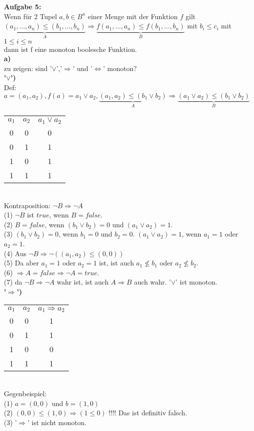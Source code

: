 \documentclass[a4paper]{scrartcl}
\begin{document}
 	\begin{flushleft}
		\textbf{Aufgabe 5:}\\
		Wenn für 2 Tupel $a,b \in B^n$ einer Menge mit der Funktion $f$ gilt $\underbrace{(a_1,\dots,a_n) \leq (b_1,\dots,b_n)}_{A}\Rightarrow \underbrace{f(a_1,\dots,a_n)\leq f(b_1,\dots,b_n)}_{B}$ mit $b_i\leq c_i$ mit $1\leq i\leq n$\\
		dann ist f eine monoton boolesche Funktion.\\[1em]
		\textbf{a)}\\
		zu zeigen: sind '$\vee$','$\Rightarrow$' und '$\Leftrightarrow$' monoton?\\[1em]
		\textbf{'$\vee$')}\\
		Def: $a=(a_1,a_2), f(a) = a_1\vee a_2, \underbrace{(a_1,a_2)\leq(b_1\vee b_2)}_{A}\Rightarrow\underbrace{(a_1\vee a_2)\leq(b_1\vee b_2)}_{B}$\\

		\begin{tabular}{|c|c|c|}
			$a_1$ & $a_2$ & $a_1\vee a_2$\\
			0 & 0 & 0 \\
			0 & 1 & 1 \\
			1 & 0 & 1 \\
			1 & 1 & 1 \\
		 \end{tabular}\\[1em]
		 Kontraposition: $\neg B \Rightarrow \neg A$\\
		 (1) $\neg B$ ist $true$, wenn $B=false$.\\
		 (2) $B=false$, wenn $(b_1\vee b_2) = 0$ und $(a_1\vee a_2) = 1$.\\
		 (3) $(b_1\vee b_2)=0$, wenn $b_1 = 0$ und $b_2 = 0$. $(a_1 \vee a_2) = 1$, wenn $a_1 = 1$ oder $a_2=1$.\\
		 (4) Aus $\neg B \Rightarrow \neg((a_1,a_2)\leq(0,0))$\\
		 (5) Da aber $a_1=1$ oder $a_2=1$ ist, ist auch $a_1\nleq b_1$ oder $a_2\nleq b_2$.\\
		 (6) $\Rightarrow A=false \Rightarrow \neg A=true$.  \\
		 (7) da $\neg B \Rightarrow \neg A$ wahr ist, ist auch $A\Rightarrow B$ auch wahr. '$\vee$' ist monoton.\\ [1em]
		
		\textbf{'$\Rightarrow$')}\\
		\begin{tabular}{|c|c|c|}
			$a_1$ & $a_2$ & $a_1\Rightarrow a_2$\\
			0 & 0 & 1 \\
			0 & 1 & 1 \\
			1 & 0 & 0 \\
			1 & 1 & 1 \\
		 \end{tabular}\\[1em]
		 Gegenbeispiel:\\
		 (1) $a=(0,0)$ und $b=(1,0)$\\
		 (2) $(0,0)\leq(1,0)\Rightarrow(1\leq 0)$ !!!! Das ist definitiv falsch.\\
		 (3)  '$\Rightarrow$' ist nicht monoton.\\[1em]


\end{flushleft}
\end{document}
